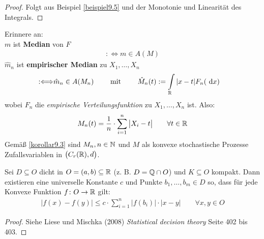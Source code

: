 \begin{proof}
	Folgt aus Beispiel \ref{beispiel9.5} und der Monotonie und Linearität des Integrals.
\end{proof}

Erinnere an:\\
$m$ ist \textbf{Median} von $F$
\begin{align*}
	:\Longleftrightarrow m\in A(M)
\end{align*}
$\hat{m}_n$ ist \textbf{empirischer Median} zu $X_1,\ldots,X_n$
\begin{align*}
	:\Longleftrightarrow&\hat{m}_n\in A(M_n)
	\qquad\text{ mit }\qquad
	\hat{M}_n(t):=\int\limits_{\mathbb{R}}|x-t| F_n(\text{ d} x)
\end{align*}
wobei $F_n$ die \textit{empirische Verteilungsfunktion} zu $X_1,\ldots,X_n$ ist.
Also:
\begin{align*}
	M_n(t)=\frac{1}{n}\cdot\sum\limits_{i=1}^n\big|X_i-t\big|\qquad\forall t\in\mathbb{R}
\end{align*}
Gemäß \ref{korollar9.3} sind $M_n,n\in\mathbb{N}$ und $M$ als	 konvexe stochastische Prozesse Zufallsvariablen in $\big(C_r(\mathbb{R}),d\big)$.

\begin{satz}\label{satz9.7}
	Sei $D\subseteq O$ dicht in $O=(a,b)\subseteq\mathbb{R}$ (z. B. $D=\mathbb{Q}\cap O$) und $K\subseteq O$ kompakt.
	Dann existieren eine universelle Konstante $c$ und Punkte $b_1,\ldots,b_m\in D$ so, dass für jede Konvexe Funktion $f\colon O\to\mathbb{R}$ gilt:
	\begin{align*}
		\big|f(x)-f(y)\big|\leq c\cdot\sum\limits_{i=1}^n\big|f(b_i)\big|\cdot|x-y|\qquad\forall x,y\in O
	\end{align*}
\end{satz}

\begin{proof}
	Siehe Liese und Mischka (2008) \textit{Statistical decision theory} Seite 402 bis 403.
\end{proof}


